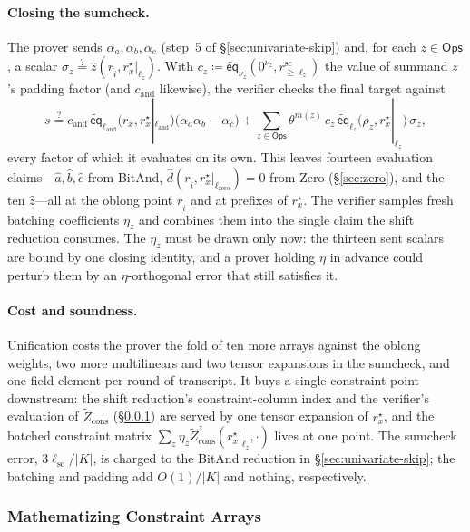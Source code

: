 \documentclass{article}
\theoremstyle{definition}
\newcommand*{\mle}{\widetilde}
\newcommand{\eq}{\mathsf{eq}}
\begin{document}
\paragraph{Closing the sumcheck.}
The prover sends $\alpha_a, \alpha_b, \alpha_c$ (step~5 of \S\ref{sec:univariate-skip}) and, for each $z \in \textsf{Ops}$, a scalar $\sigma_z \stackrel{?}{=} \widehat{z}(r_{\widehat{i}}, r^\star_x|_{\ell_z})$. With $c_z \coloneqq \mle{\eq}_{\nu_z}(0^{\nu_z}, r^\text{sc}_{\geq \ell_z})$ the value of summand $z$'s padding factor (and $c_\text{and}$ likewise), the verifier checks the final target against
\[
  s \stackrel{?}{=} c_\text{and} \, \mle{\eq}_{\ell_\text{and}}\bigl( r_x, r^\star_x|_{\ell_\text{and}} \bigr) \bigl( \alpha_a \alpha_b - \alpha_c \bigr)
  + \sum_{z \in \textsf{Ops}} \theta^{m(z)} \, c_z \, \mle{\eq}_{\ell_z}\bigl( \rho_z, r^\star_x|_{\ell_z} \bigr) \, \sigma_z,
\]
every factor of which it evaluates on its own. This leaves fourteen evaluation claims---$\widehat{a}, \widehat{b}, \widehat{c}$ from BitAnd, $\widehat{d}(r_{\widehat{i}}, r^\star_x|_{\ell_\text{zero}}) = 0$ from Zero (\S\ref{sec:zero}), and the ten $\widehat{z}$---all at the oblong point $r_{\widehat{i}}$ and at prefixes of $r^\star_x$. The verifier samples fresh batching coefficients $\eta_z$ and combines them into the single claim the shift reduction consumes. The $\eta_z$ must be drawn only now: the thirteen sent scalars are bound by one closing identity, and a prover holding $\eta$ in advance could perturb them by an $\eta$-orthogonal error that still satisfies it.

\paragraph{Cost and soundness.}
Unification costs the prover the fold of ten more arrays against the oblong weights, two more multilinears and two tensor expansions in the sumcheck, and one field element per round of transcript. It buys a single constraint point downstream: the shift reduction's constraint-column index and the verifier's evaluation of $\mle{Z}_\text{cons}$ (\S\ref{sec:mathematizing}) are served by one tensor expansion of $r^\star_x$, and the batched constraint matrix $\sum_z \eta_z \mle{Z}^z_\text{cons}(r^\star_x|_{\ell_z}, \cdot)$ lives at one point. The sumcheck error, $3 \ell_\text{sc} / |K|$, is charged to the BitAnd reduction in \S\ref{sec:univariate-skip}; the batching and padding add $O(1) / |K|$ and nothing, respectively.

\subsubsection{Mathematizing Constraint Arrays}
\label{sec:mathematizing}
\end{document}
